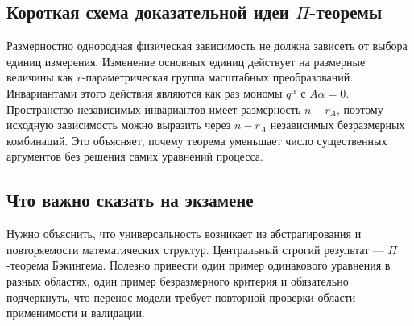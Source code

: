\subsection[Короткая схема доказательной идеи Пи-теоремы]{Короткая схема доказательной идеи $\Pi$-теоремы}

Размерностно однородная физическая зависимость не должна зависеть от выбора
единиц измерения. Изменение основных единиц действует на размерные величины как
$r$-параметрическая группа масштабных преобразований. Инвариантами этого действия
являются как раз мономы $q^\alpha$ с $A\alpha=0$. Пространство независимых
инвариантов имеет размерность $n-r_A$, поэтому исходную зависимость можно
выразить через $n-r_A$ независимых безразмерных комбинаций. Это объясняет, почему
теорема уменьшает число существенных аргументов без решения самих уравнений
процесса.

\subsection{Что важно сказать на экзамене}

Нужно объяснить, что универсальность возникает из абстрагирования и
повторяемости математических структур. Центральный строгий результат ---
$\Pi$-теорема Бэкингема. Полезно привести один пример одинакового уравнения
в разных областях, один пример безразмерного критерия и обязательно
подчеркнуть, что перенос модели требует повторной проверки области
применимости и валидации.

\newpage
